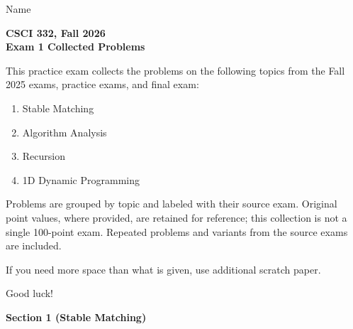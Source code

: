 \documentclass[11pt]{article}
\begin{document}
\noindent Name \underline{\hspace{12cm}}\\

\begin{center}
\Large\textbf{CSCI 332, Fall 2026}\\
\LARGE\textbf{Exam 1 Collected Problems}
\end{center}

\noindent This practice exam collects the problems on the following topics from
 the Fall 2025 exams, practice exams, and final exam:
\begin{enumerate}
    \item Stable Matching
    \item Algorithm Analysis
    \item Recursion
    \item 1D Dynamic Programming
\end{enumerate}

Problems are grouped by topic and labeled with their source exam. Original
point values, where provided, are retained for reference; this collection is
not a single 100-point exam. Repeated problems and variants from the source
exams are included.

If you need more space than what is given, use additional scratch paper.

Good luck!

\newpage

\begin{center}
\LARGE\textbf{Section 1 (Stable Matching)\\}%
\end{center}

\end{document}
